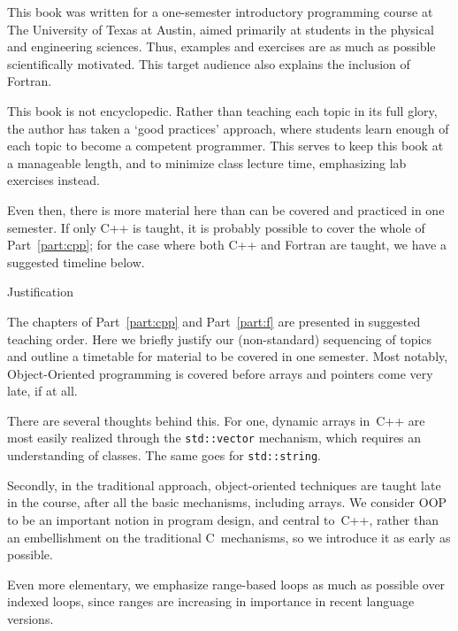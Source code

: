 
This book was written for a one-semester introductory programming course at The
University of Texas at Austin, aimed primarily at students in the
physical and engineering sciences. Thus, examples and exercises are as
much as possible scientifically motivated. This target audience also
explains the inclusion of Fortran.

This book is not encyclopedic. Rather than teaching each topic in its
full glory,
the author has taken a `good practices' approach, where students learn
enough of each topic to become a competent programmer. This serves to
keep this book at a manageable length, and to minimize class lecture
time, emphasizing lab exercises instead.

Even then, there is more material here than can be covered and
practiced in one semester. If only C++ is taught, it is probably
possible to cover the whole of Part~\ref{part:cpp}; for the case where
both C++ and Fortran are taught, we have a suggested timeline below.

 {Justification}

The chapters of Part~\ref{part:cpp} and Part~\ref{part:f} are
presented in suggested teaching order. 
Here we briefly justify our (non-standard) sequencing of topics and
outline a timetable for material to be covered in one semester.
Most notably, Object-Oriented programming is covered
before arrays and pointers come very late, if at all.

There are several thoughts behind this. For one, dynamic arrays in~C++
are most easily realized through the \lstinline{std::vector} mechanism, which
requires an understanding of classes. The same goes for
\lstinline{std::string}.

Secondly, in the traditional approach, object-oriented techniques are
taught late in the course, after all the basic mechanisms, including
arrays. We consider OOP to be an important notion in program design,
and central to~C++, rather than an embellishment on the traditional
C~mechanisms, so we introduce it as early as possible.

Even more elementary, we emphasize range-based loops as much as
possible over indexed loops, since ranges are increasing in importance
in recent language versions.

